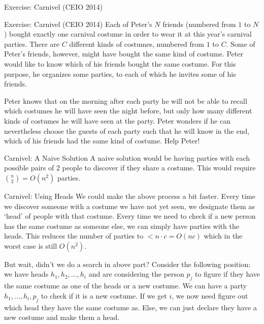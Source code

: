 \documentclass[9pt]{beamer}
\newenvironment{exbox}[1]{\begin{block}{Exercise: #1}}{\end{block}}
\begin{document}
\begin{frame}{Exercise: Carnivel (CEIO 2014)}
\begin{exbox}{Carnivel (CEIO 2014)}
\small
Each of Peter's $N$ friends (numbered from $1$ to $N$) bought exactly one carnival costume in order to wear it at this year's carnival parties. There are $C$ different kinds of costumes, numbered from $1$ to $C$. Some of Peter's friends, however, might have bought the same kind of costume. Peter would like to know which of his friends bought the same costume. For this purpose, he organizes some parties, to each of which he invites some of his friends.

Peter knows that on the morning after each party he will not be able to recall which costumes he will have seen the night before, but only how many different kinds of costumes he will have seen at the party. Peter wonders if he can nevertheless choose the guests of each party such that he will know in the end, which of his friends had the same kind of costume. Help Peter!
\end{exbox}
\end{frame}

\begin{frame}{Carnivel: A Naive Solution}
A naive solution would be having parties with each possible pairs of $2$ people to discover if they share a costume. This would require $\binom{n}{2} = O(n^2)$ parties.
\end{frame}

\begin{frame}{Carnivel: Using Heads}
We could make the above process a bit faster. Every time we discover someone with a costume we have not yet seen, we designate them as `head' of people with that costume. Every time we need to check if a new person has the same costume as someone else, we can simply have parties with the heads. This reduces the number of parties to $< n \cdot c = O(nc)$ which in the worst case is still $O(n^2)$.

But wait, didn't we do a search in above part? Consider the following position: we have heads $h_1, h_2, \ldots, h_i$ and are considering the person $p_j$ to figure if they have the same costume as one of the heads or a new costume. We can have a party $h_1, \ldots, h_i, p_j$ to check if it is a new costume. If we get $i$, we now need figure out which head they have the same costume as. Else, we can just declare they have a new costume and make them a head.
\end{frame}
\end{document}
